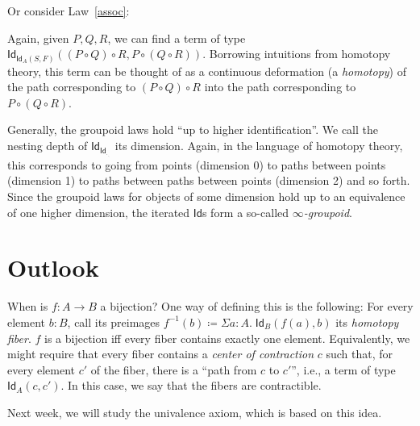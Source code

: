 \documentclass{article} \usepackage{chtt-notes} \usepackage{stmaryrd}
\begin{document}
Or consider Law~\ref{assoc}:
\begin{center}\end{center}
Again, given $P, Q, R$, we can find a term of type $\textsf{Id}_{\textsf{Id}_A(S, F)}((P \circ Q) \circ R, P \circ (Q \circ R))$.
Borrowing intuitions from homotopy theory, this term can be thought of as a continuous deformation (a \emph{homotopy}) of the path corresponding to $(P \circ Q) \circ R$ into the path corresponding to $P \circ (Q \circ R)$.

Generally, the groupoid laws hold ``up to higher identification''.
We call the nesting depth of $\textsf{Id}_{\textsf{Id}_{._{._{.}}}}$ its dimension.
Again, in the language of homotopy theory, this corresponds to going from points (dimension 0) to paths between points (dimension 1) to paths between paths between points (dimension 2) and so forth.
Since the groupoid laws for objects of some dimension hold up to an equivalence of one higher dimension, the iterated $\textsf{Id}$s form a so-called \emph{$\infty$-groupoid}.

\section{Outlook}
When is $f : A \to B$ a bijection?
One way of defining this is the following:
For every element $b : B$, call its preimages $f^{-1}(b) \coloneqq \Sigma a: A. \; \textsf{Id}_{B}(f(a), b)$ its \emph{homotopy fiber}.
$f$ is a bijection iff every fiber contains exactly one element.
Equivalently, we might require that every fiber contains a \emph{center of contraction} $c$ such that, for every element $c'$ of the fiber, there is a ``path from $c$ to $c'$'', i.e., a term of type $\textsf{Id}_A(c, c')$.
In this case, we say that the fibers are contractible.

Next week, we will study the univalence axiom, which is based on this idea.
\end{document}
